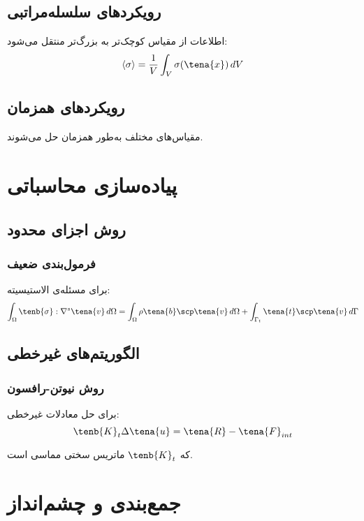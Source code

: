 \subsection{رویکردهای سلسله‌مراتبی}

اطلاعات از مقیاس کوچک‌تر به بزرگ‌تر منتقل می‌شود:
\begin{equation}
	\langle \sigma \rangle = \frac{1}{V} \int_V \sigma(\tena{x}) \, dV
\end{equation}

\subsection{رویکردهای همزمان}

مقیاس‌های مختلف به‌طور همزمان حل می‌شوند.

\section{پیاده‌سازی محاسباتی}

\subsection{روش اجزای محدود}

\subsubsection{فرمول‌بندی ضعیف}
برای مسئله‌ی الاستیسیته:
\begin{equation}
	\int_\Omega \tenb{\sigma} : \nabla^s \tena{v} \, d\Omega = \int_\Omega \rho \tena{b} \scp \tena{v} \, d\Omega + \int_{\Gamma_t} \tena{t} \scp \tena{v} \, d\Gamma
\end{equation}

\subsection{الگوریتم‌های غیرخطی}

\subsubsection{روش نیوتن-رافسون}
برای حل معادلات غیرخطی:
\begin{equation}
	\tenb{K}_t \Delta \tena{u} = \tena{R} - \tena{F}_{int}
\end{equation}

که $\tenb{K}_t$ ماتریس سختی مماسی است.

\section{جمع‌بندی و چشم‌انداز}

